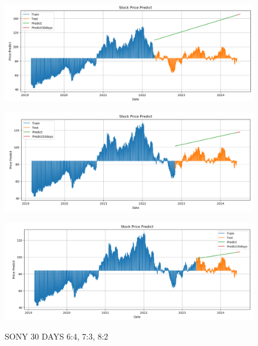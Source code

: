 \documentclass{article}
\begin{document}
\begin{multicols}{2}
\begin{figure}[H]
    \centering
    \begin{minipage}{0.15\textwidth}
    \centering
    \includegraphics[width=1\textwidth]{Image/Linear/Linear_SONY_6_4_30DAYS.png}
   
    \label{fig:1}
    \end{minipage}%
    \begin{minipage}{0.15\textwidth}
    \centering
    \includegraphics[width=1\textwidth]{Image/Linear/Linear_SONY_7_3_30DAYS.png}
  
    \label{fig:2}
    \end{minipage}%
    \begin{minipage}{0.15\textwidth}
    \centering
    \includegraphics[width=1\textwidth]{Image/Linear/Linear_SONY_8_2_30DAYS.png}

    \label{fig:3}
    \end{minipage}
    \caption{SONY 30 DAYS  6:4, 7:3, 8:2 }
\end{figure}


\end{multicols}
\end{document}
